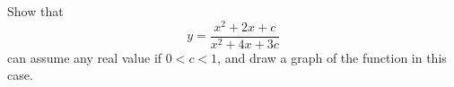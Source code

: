 Show that
\[
y = \frac{x^{2} + 2x + c}{x^{2} + 4x + 3c}
\]
can assume any real value if $0 < c < 1$, and draw a graph of the function in
this case. 

